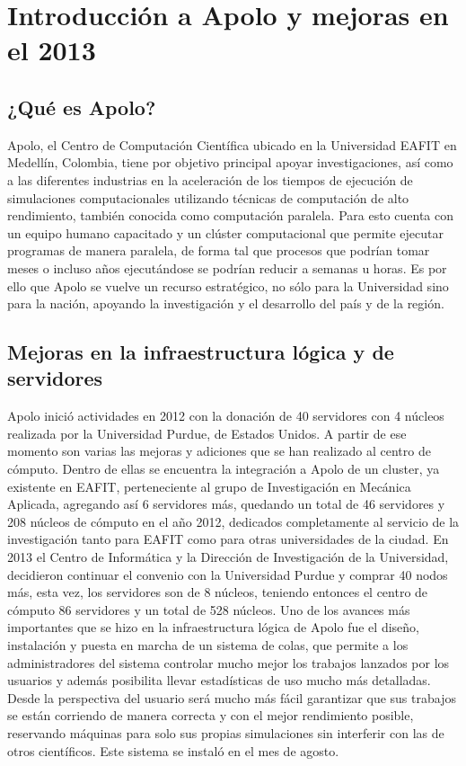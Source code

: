 \section{Introducción a Apolo y mejoras en el 2013}

\subsection{¿Qué es Apolo?}
Apolo, el Centro de Computación Científica ubicado en la Universidad EAFIT en Medellín, Colombia, tiene por objetivo principal apoyar investigaciones, así como a las diferentes industrias en la aceleración de los tiempos de ejecución de simulaciones computacionales utilizando técnicas de computación de alto rendimiento, también conocida como computación paralela. Para esto cuenta con un equipo humano capacitado y un clúster computacional que permite ejecutar programas de manera paralela, de forma tal que procesos que podrían tomar meses o incluso años ejecutándose se podrían reducir a semanas u horas. Es por ello que Apolo se vuelve un recurso estratégico, no sólo para la Universidad sino para la nación, apoyando la investigación y el desarrollo del país y de la región. 

\subsection{Mejoras en la infraestructura lógica y de servidores}

Apolo inició actividades en 2012 con la donación de 40 servidores con 4 núcleos realizada por la Universidad Purdue, de Estados Unidos. A partir de ese momento son varias las mejoras y adiciones que se han realizado al centro de cómputo. Dentro de ellas se encuentra la integración a Apolo de un cluster, ya existente en EAFIT, perteneciente al grupo de Investigación en Mecánica Aplicada, agregando así 6 servidores más, quedando un total de 46 servidores y 208 núcleos de cómputo en el año 2012, dedicados completamente al servicio de la investigación tanto para EAFIT como para otras universidades de la ciudad.
En 2013 el Centro de Informática y la Dirección de Investigación de la Universidad, decidieron continuar el convenio con la Universidad Purdue y comprar 40 nodos más, esta vez, los servidores son de 8 núcleos, teniendo entonces el centro de cómputo 86 servidores y un total de 528 núcleos. Uno de los avances más importantes que se hizo en la infraestructura lógica de Apolo fue el diseño, instalación y puesta en marcha de un sistema de colas, que permite a los administradores del sistema controlar mucho mejor los trabajos lanzados por los usuarios y además posibilita llevar estadísticas de uso mucho más detalladas. Desde la perspectiva del usuario será mucho más fácil garantizar que sus trabajos se están corriendo de manera correcta y con el mejor rendimiento posible, reservando máquinas para solo sus propias simulaciones sin interferir con las de otros científicos. Este sistema se instaló en el mes de agosto. 

